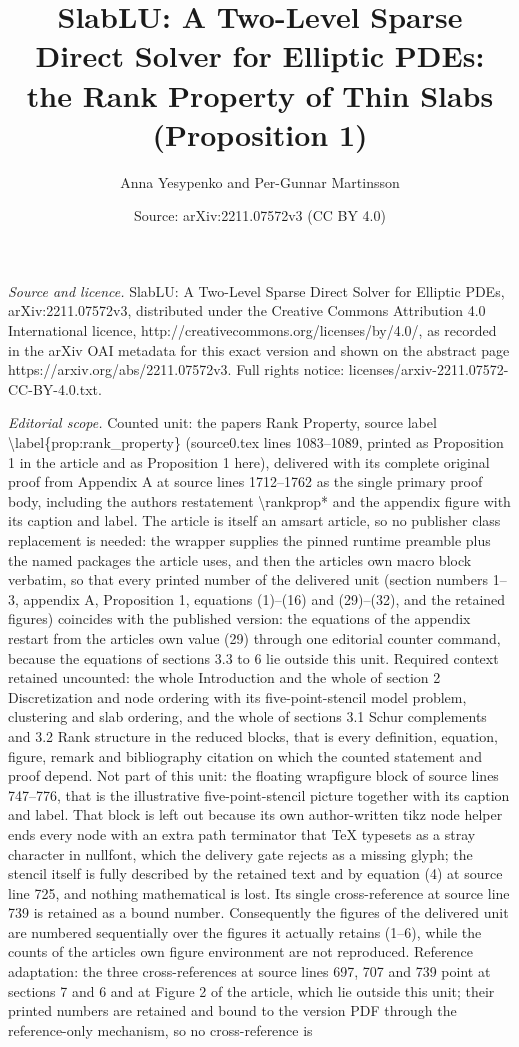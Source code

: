 \documentclass[10pt,a4paper]{amsart}
\title[SlabLU: A Two-Level Sparse Direct Solver for Elliptic PDEs]{SlabLU: A Two-Level Sparse Direct Solver for Elliptic PDEs: the Rank Property of Thin Slabs (Proposition 1)}
\author{Anna Yesypenko and Per-Gunnar Martinsson}
\date{Source: arXiv:2211.07572v3 (CC BY 4.0)}
\begin{document}
\maketitle
\noindent\emph{Source and licence.} SlabLU: A Two-Level Sparse Direct Solver for Elliptic PDEs, arXiv:2211.07572v3, distributed under the Creative Commons Attribution 4.0 International licence, http://creativecommons.org/licenses/by/4.0/, as recorded in the arXiv OAI metadata for this exact version and shown on the abstract page https://arxiv.org/abs/2211.07572v3. Full rights notice: licenses/arxiv-2211.07572-CC-BY-4.0.txt.\par\smallskip
\noindent\textit{Editorial scope.} Counted unit: the paper\textquotesingle s Rank Property, source label \textbackslash{}label\{prop:rank\_property\} (source0.tex lines 1083--1089, printed as Proposition 1 in the article and as Proposition 1 here), delivered with its complete original proof from Appendix A at source lines 1712--1762 as the single primary proof body, including the author\textquotesingle s restatement \textbackslash{}rankprop* and the appendix figure with its caption and label. The article is itself an amsart article, so no publisher class replacement is needed: the wrapper supplies the pinned runtime preamble plus the named packages the article uses, and then the article\textquotesingle s own macro block verbatim, so that every printed number of the delivered unit (section numbers 1--3, appendix A, Proposition 1, equations (1)--(16) and (29)--(32), and the retained figures) coincides with the published version: the equations of the appendix restart from the article\textquotesingle s own value (29) through one editorial counter command, because the equations of sections 3.3 to 6 lie outside this unit. Required context retained uncounted: the whole Introduction and the whole of section 2 Discretization and node ordering with its five-point-stencil model problem, clustering and slab ordering, and the whole of sections 3.1 Schur complements and 3.2 Rank structure in the reduced blocks, that is every definition, equation, figure, remark and bibliography citation on which the counted statement and proof depend. Not part of this unit: the floating wrapfigure block of source lines 747--776, that is the illustrative five-point-stencil picture together with its caption and label. That block is left out because its own author-written tikz node helper ends every node with an extra path terminator that TeX typesets as a stray character in nullfont, which the delivery gate rejects as a missing glyph; the stencil itself is fully described by the retained text and by equation (4) at source line 725, and nothing mathematical is lost. Its single cross-reference at source line 739 is retained as a bound number. Consequently the figures of the delivered unit are numbered sequentially over the figures it actually retains (1--6), while the counts of the article\textquotesingle s own figure environment are not reproduced. Reference adaptation: the three cross-references at source lines 697, 707 and 739 point at sections 7 and 6 and at Figure 2 of the article, which lie outside this unit; their printed numbers are retained and bound to the version PDF through the reference-only mechanism, so no cross-reference is 
\end{document}
